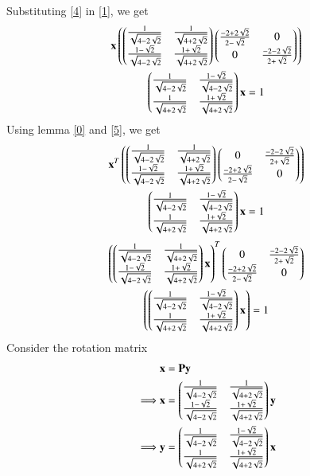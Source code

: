 \documentclass[journal,12pt,twocolumn]{IEEEtran}
\begin{document}
Substituting \eqref{4} in \eqref{1}, we get
\begin{multline}
	\mathbf{x}\left(\begin{pmatrix}\frac{1}{\sqrt{4-2\sqrt{2}}} & \frac{1}{\sqrt{4+2\sqrt{2}}} \\ \frac{1-\sqrt{2}}{\sqrt{4-2\sqrt{2}}} & \frac{1 + \sqrt{2}}{\sqrt{4+2\sqrt{2}}}\end{pmatrix}
	\begin{pmatrix}\frac{-2 + 2\sqrt{2}}{2-\sqrt{2}} & 0 \\ 0 &\frac{-2-2\sqrt{2}}{2+\sqrt{2}}\end{pmatrix}\right) \\
	\begin{pmatrix}\frac{1}{\sqrt{4-2\sqrt{2}}} & \frac{1-\sqrt{2}}{\sqrt{4-2\sqrt{2}}} \\ \frac{1}{\sqrt{4+2\sqrt{2}}}  & \frac{1 + \sqrt{2}}{\sqrt{4+2\sqrt{2}}}\end{pmatrix}\mathbf{x} = 1 \label{5}
\end{multline} 
Using lemma \eqref{0} and \eqref{5}, we get  
\begin{multline}
	\mathbf{x}^T\left(\begin{pmatrix}\frac{1}{\sqrt{4-2\sqrt{2}}} & \frac{1}{\sqrt{4+2\sqrt{2}}} \\ 
			\frac{1-\sqrt{2}}{\sqrt{4-2\sqrt{2}}} & \frac{1 + \sqrt{2}}{\sqrt{4+2\sqrt{2}}}\end{pmatrix}
	\begin{pmatrix}0 & \frac{-2-2\sqrt{2}}{2+\sqrt{2}} \\ \frac{-2 + 2\sqrt{2}}{2-\sqrt{2}} & 0\end{pmatrix}\right)\\
	\begin{pmatrix}\frac{1}{\sqrt{4-2\sqrt{2}}} & \frac{1-\sqrt{2}}{\sqrt{4-2\sqrt{2}}} \\ \frac{1}{\sqrt{4+2\sqrt{2}}}  & \frac{1 + \sqrt{2}}{\sqrt{4+2\sqrt{2}}}\end{pmatrix}\mathbf{x} = 1 
\end{multline}
\begin{multline}
\left(\begin{pmatrix}\frac{1}{\sqrt{4-2\sqrt{2}}} & \frac{1}{\sqrt{4+2\sqrt{2}}} \\ 
\frac{1-\sqrt{2}}{\sqrt{4-2\sqrt{2}}} & \frac{1 + \sqrt{2}}{\sqrt{4+2\sqrt{2}}}\end{pmatrix} \mathbf{x}\right)^T
\begin{pmatrix}0 & \frac{-2-2\sqrt{2}}{2+\sqrt{2}} \\ \frac{-2 + 2\sqrt{2}}{2-\sqrt{2}} & 0\end{pmatrix} \\
\left(\begin{pmatrix}\frac{1}{\sqrt{4-2\sqrt{2}}} & \frac{1-\sqrt{2}}{\sqrt{4-2\sqrt{2}}} \\ \frac{1}{\sqrt{4+2\sqrt{2}}}  & \frac{1 + \sqrt{2}}{\sqrt{4+2\sqrt{2}}}\end{pmatrix}\mathbf{x}\right) = 1 \label{6}
\end{multline}
Consider the rotation matrix
\begin{align}
& \mathbf{x} = \mathbf{P}\mathbf{y} \\
\implies & \mathbf{x}= \begin{pmatrix}\frac{1}{\sqrt{4-2\sqrt{2}}} & \frac{1}{\sqrt{4+2\sqrt{2}}} \\ \frac{1-\sqrt{2}}{\sqrt{4-2\sqrt{2}}} & \frac{1 + \sqrt{2}}{\sqrt{4+2\sqrt{2}}} \end{pmatrix}\mathbf{y}\\
\implies & \mathbf{y} = \begin{pmatrix}\frac{1}{\sqrt{4-2\sqrt{2}}} & \frac{1-\sqrt{2}}{\sqrt{4-2\sqrt{2}}} \\ \frac{1}{\sqrt{4+2\sqrt{2}}}  & \frac{1 + \sqrt{2}}{\sqrt{4+2\sqrt{2}}}\end{pmatrix}\mathbf{x} \label{7}
\end{align}
\end{document}
